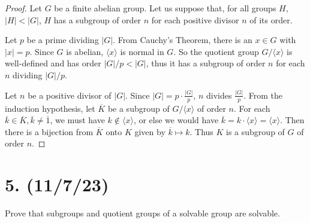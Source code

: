 \documentclass{article}
\begin{document}
\begin{proof}
    Let $G$ be a finite abelian group. Let us suppose that, for all groups $H$, $|H| < |G|$, $H$ has a subgroup of order $n$ for each positive divisor $n$ of its order.

    Let $p$ be a prime dividing $|G|$. From Cauchy's Theorem, there is an $x \in G$ with $|x| = p$. Since $G$ is abelian, $\langle x \rangle$ is normal in $G$. So the quotient group $G/\langle x \rangle$ is well-defined and has order $|G|/p < |G|$, thus it has a subgroup of order $n$ for each $n$ dividing $|G|/p$.
    
    Let $n$ be a positive divisor of $|G|$. Since $|G| = p \cdot \frac{|G|}{p}$, $n$ divides $\frac{|G|}{p}$. From the induction hypothesis, let $\overline{K}$ be a subgroup of $G/\langle x \rangle$ of order $n$. For each $\overline{k} \in \overline{K}, \overline{k} \neq \overline{1}$, we must have $k \notin \langle x \rangle$, or else we would have $\overline{k} = k \cdot \langle x \rangle = \langle x \rangle$. Then there is a bijection from $\overline{K}$ onto $K$ given by $\overline{k} \mapsto k$. Thus $K$ is a subgroup of $G$ of order $n$.
\end{proof}

\section*{5. (11/7/23)}

Prove that subgroups and quotient groups of a solvable group are solvable.
\end{document}

